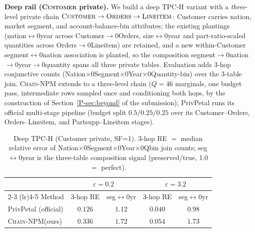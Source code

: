 \documentclass[sigconf, nonacm]{acmart}
\newcommand{\chainnpm}{\textsc{Chain-NPM}\xspace}
\newcommand{\psec}[1]{Section~\ref{P-sec:#1} of the submission}
\begin{document}
\textbf{Deep rail (\textsc{Customer} private).} We build a deep TPC-H variant with a \emph{three}-level private chain
$\textsc{Customer}\to\textsc{Orders}\to\textsc{Lineitem}$: Customer carries
nation, market segment, and account-balance-bin attributes; the existing
plantings (nation$\leftrightarrow$\penalty0year across Customer$\to$\penalty0Orders,
size$\leftrightarrow$\penalty0year and part-ratio-scaled quantities across
Orders$\to$\penalty0Lineitem) are retained, and a new within-Customer
segment$\leftrightarrow$\penalty0nation association is planted, so the composition
segment$\to$\penalty0nation$\to$\penalty0year$\to$\penalty0quantity spans all three private tables.
Evaluation adds 3-hop conjunctive counts
(Nation$\times$\penalty0Segment$\times$\penalty0Year$\times$\penalty0Quantity-bin) over the 3-table
join. \chainnpm extends to a three-level chain ($Q{=}46$ marginals, one
budget pass, intermediate rows sampled once and conditioning both hops, by
the construction of \psec{beyond});
PrivPetal runs its official multi-stage pipeline (budget split
$0.5/0.25/0.25$ over its Customer--Orders, Orders--Lineitem, and
Partsupp--Lineitem stages).

\begin{table}[t]
\centering
\caption{Deep TPC-H (Customer private, SF=1). 3-hop RE $=$ median relative
error of Nation$\times$\penalty0Segment$\times$\penalty0Year$\times$\penalty0Qbin join counts;
seg$\leftrightarrow$\penalty0year is the three-table composition signal
(preserved/true, 1.0 $=$ perfect).}
\label{tab:tpch-deep}
\small
\begin{tabular}{@{}lcccc@{}}
\toprule
 & \multicolumn{2}{c}{$\varepsilon{=}0.2$} & \multicolumn{2}{c}{$\varepsilon{=}3.2$} \\
\cmidrule(lr){2-3} \cmidrule(lr){4-5}
Method & 3-hop RE & seg\penalty0$\leftrightarrow$\penalty0yr & 3-hop RE & seg\penalty0$\leftrightarrow$\penalty0yr \\
\midrule
PrivPetal (official) & $0.126$ & $1.12$ & $0.040$ & $0.98$ \\
\chainnpm (ours) & $0.336$ & $1.72$ & $0.054$ & $1.73$ \\
\bottomrule
\end{tabular}
\end{table}
\end{document}

